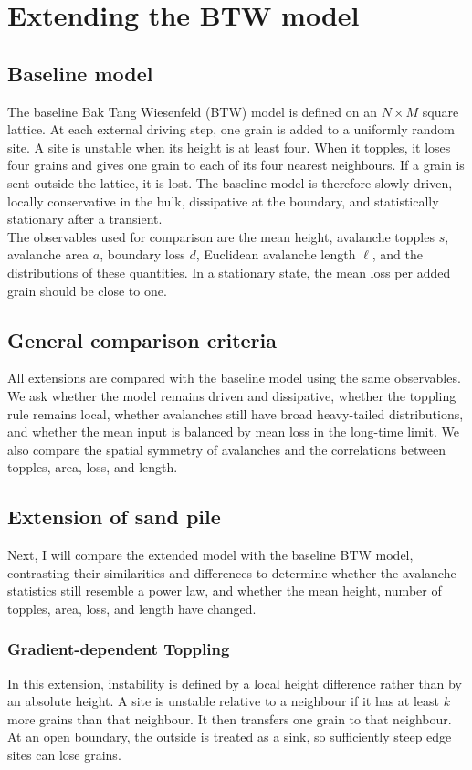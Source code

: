 \documentclass{article}
\begin{document}
\section{Extending the \textbf{BTW} model}
\subsection{Baseline model}

The baseline Bak Tang Wiesenfeld (BTW) model is defined on an $N\times M$ square lattice. At each external driving step, one grain is added to a uniformly random site. A site is unstable when its height is at least four. When it topples, it loses four grains and gives one grain to each of its four nearest neighbours. If a grain is sent outside the lattice, it is lost. The baseline model is therefore slowly driven, locally conservative in the bulk, dissipative at the boundary, and statistically stationary after a transient. \\

The observables used for comparison are the mean height, avalanche topples $s$, avalanche area $a$, boundary loss $d$, Euclidean avalanche length $\ell$, and the distributions of these quantities. In a stationary state, the mean loss per added grain should be close to one.

\subsection{General comparison criteria}

All extensions are compared with the baseline model using the same observables. We ask whether the model remains driven and dissipative, whether the toppling rule remains local, whether avalanches still have broad heavy-tailed distributions, and whether the mean input is balanced by mean loss in the long-time limit. We also compare the spatial symmetry of avalanches and the correlations between topples, area, loss, and length. 

\subsection{Extension of sand pile}
Next, I will compare the extended model with the baseline BTW model, contrasting their similarities and differences to determine whether the avalanche statistics still resemble a power law, and whether the mean height, number of topples, area, loss, and length have changed.

\subsubsection{Gradient-dependent Toppling}
In this extension, instability is defined by a local height difference rather than by an absolute height. A site is unstable relative to a neighbour if it has at least $k$ more grains than that neighbour. It then transfers one grain to that neighbour. At an open boundary, the outside is treated as a sink, so sufficiently steep edge sites can lose grains. \\
\end{document}
